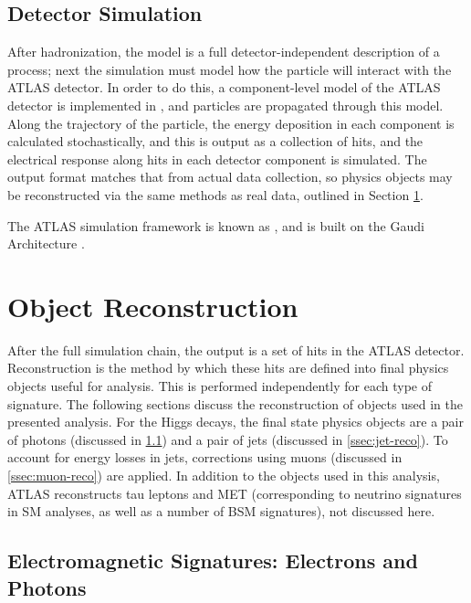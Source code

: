 \subsection{Detector Simulation}  \label{ssec:simulation}
After hadronization, the model is a full detector-independent description of a process; next the simulation must model how the particle will interact with the ATLAS detector. In order to do this, a component-level model of the ATLAS detector is implemented in \GEANTFOUR \cite{geant4}, and particles are propagated through this model. Along the trajectory of the particle, the energy deposition in each component is calculated stochastically, and this is output as a collection of hits, and the electrical response along hits in each detector component is simulated. The output format matches that from actual data collection, so physics objects may be reconstructed via the same methods as real data, outlined in Section \ref{sec:reconstruction}.

The ATLAS simulation framework is known as \ATHENA, and is built on the Gaudi Architecture \cite{gaudi}.

\section{Object Reconstruction} \label{sec:reconstruction}

After the full simulation chain, the output is a set of hits in the ATLAS detector. Reconstruction is the method by which these hits are defined into final physics objects useful for analysis. This is performed independently for each type of signature. The following sections discuss the reconstruction of objects used in the presented analysis. For the Higgs decays, the final state physics objects are a pair of photons (discussed in \ref{ssec:em-signatures}) and a pair of jets (discussed in \ref{ssec:jet-reco}). To account for energy losses in jets, corrections using muons (discussed in \ref{ssec:muon-reco}) are applied. In addition to the objects used in this analysis, ATLAS reconstructs tau leptons and \gls{MET} (corresponding to neutrino signatures in \gls{SM} analyses, as well as a number of \gls{BSM} signatures), not discussed here.

\subsection{Electromagnetic Signatures: Electrons and Photons} \label{ssec:em-signatures} %

